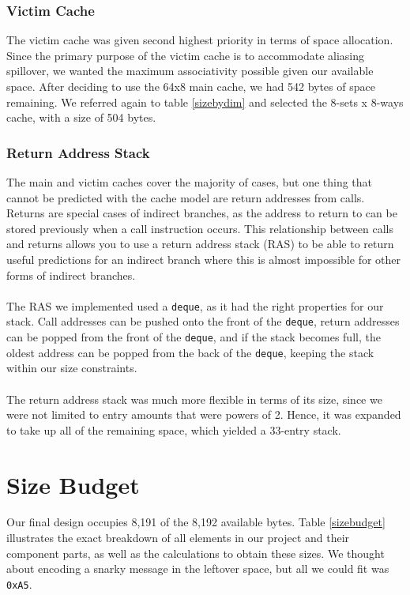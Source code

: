 \documentclass[twocolumn]{article}
\begin{document}
\subsubsection{Victim Cache}
The victim cache was given second highest priority in terms of space allocation.  Since the primary purpose of the victim cache is to accommodate aliasing spillover, we wanted the maximum associativity possible given our available space.   After deciding to use the 64x8 main cache, we had 542 bytes of space remaining.  We referred again to table \ref{sizebydim} and selected the 8-sets x 8-ways cache, with a size of 504 bytes.  
\subsubsection{Return Address Stack}
The main and victim caches cover the majority of cases, but one thing that cannot be predicted with the cache model are return addresses from calls. Returns are special cases of indirect branches, as the address to return to can be stored previously when a call instruction occurs. This relationship between calls and returns allows you to use a return address stack (RAS) to be able to return useful predictions for an indirect branch where this is almost impossible for other forms of indirect branches.\\\\ 
The RAS we implemented used a \texttt{deque}, as it had the right properties for our stack. Call addresses can be pushed onto the front of the \texttt{deque}, return addresses can be popped from the front of the \texttt{deque}, and if the stack becomes full, the oldest address can be popped from the back of the \texttt{deque}, keeping the stack within our size constraints.\\\\
The return address stack was much more flexible in terms of its size, since we were not limited to entry amounts that were powers of 2.  Hence, it was expanded to take up all of the remaining space, which yielded a 33-entry stack.
\section{Size Budget}
Our final design occupies 8,191 of the 8,192 available bytes. Table \ref{sizebudget} illustrates the exact breakdown of all elements in our project and their component parts, as well as the calculations to obtain these sizes.  We thought about encoding a snarky message in the leftover space, but all we could fit was \texttt{0xA5}.
\end{document}
